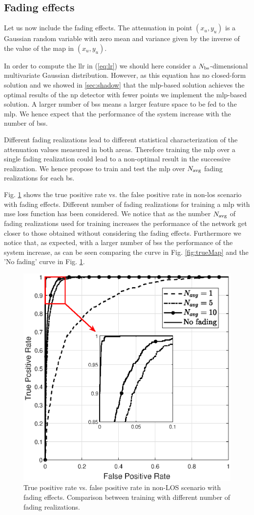 \documentclass[draftcls,onecolumn,12pt]{IEEEtran}
\begin{document}
\subsection{Fading effects}
Let us now include the fading effects. The attenuation in point $(x_u,y_u)$ is a Gaussian random variable with zero mean and variance given by the inverse of the value of the map in $(x_u,y_u)$.


In order to compute the \ac{llr} in (\ref{eq:lr}) we should here consider a $N_{\rm bs}$-dimensional multivariate Gaussian distribution. However, as this equation has no closed-form solution and we showed in \ref{sec:shadow} that the \ac{mlp}-based solution achieves the optimal results of the \ac{np} detector with fewer points we implement the \ac{mlp}-based solution. A larger number of \acp{bs} means a larger feature space to be fed to the \ac{mlp}. We hence expect that the performance of the system increase with the number of \acp{bs}.

Different fading realizations lead to different statistical characterization of the attenuation values measured in both areas. Therefore training the \ac{mlp} over a single fading realization could lead to a non-optimal result in the successive realization. We hence propose to train and test the \ac{mlp} over $N_{\rm avg}$ fading realizations for each \ac{bs}.

Fig. \ref{fig:faded} shows the true positive rate vs. the false positive rate in non-\ac{los} scenario with fading effects. Different number of fading realizations for training a \ac{mlp} with \ac{mse} loss function has been considered. We notice that as the number $N_{\rm avg}$ of fading realizations used for training increases the performance of the network get closer to those obtained without considering the fading effects. Furthermore we notice that, as expected, with a larger number of \acp{bs} the performance of the system increase, as can be seen comparing the curve in Fig. \ref{fig:trueMap} and the 'No fading' curve in Fig. \ref{fig:faded}.

\begin{figure}
    \centering
    \includegraphics[width=0.5\columnwidth]{Navg.eps}
    \caption{True positive rate vs. false positive rate in non-LOS scenario with fading effects. Comparison between training with different number of fading realizations.}
    \label{fig:faded}
\end{figure}
\newpage 


\printbibliography

%
%
\end{document}
